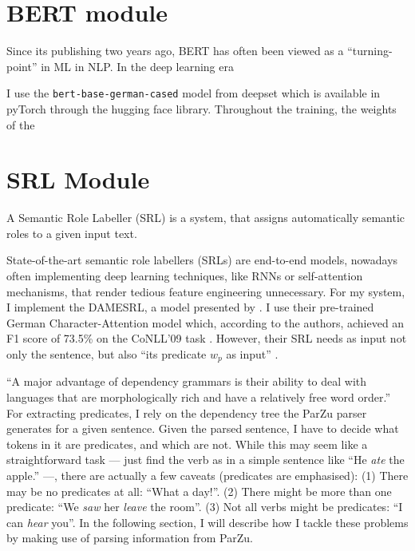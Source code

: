 \section{BERT module}

Since its publishing two years ago, BERT \citep{devlin2018bert} has often been viewed as a
``turning-point'' in ML in NLP. In the deep learning era 

I use the \texttt{bert-base-german-cased} model from deepset which is available in pyTorch
through the hugging face library\cite{wolf2019transformers}.
Throughout the training, the weights of the 

\section{SRL Module}

A Semantic Role Labeller (SRL) is a system, that assigns automatically semantic roles to a
given input text.

State-of-the-art semantic role labellers (SRLs) are end-to-end models, nowadays often
implementing deep learning techniques, like RNNs or self-attention mechanisms, that render
tedious feature engineering unnecessary.  For my system, I implement the DAMESRL, a model
presented by \cite{do2018flexible}.  I use their pre-trained German Character-Attention
model which, according to the authors, achieved an F1 score of 73.5\% on the CoNLL'09 task
\citep{hajivc2009conll}.  However, their SRL needs as input not only the sentence, but also
``its predicate $w_p$ as input'' \citep{do2018flexible}.

``A major advantage of dependency grammars is their ability to deal with languages that are
morphologically rich and have a relatively free word order.'' \citep[p.~274]{jurafsky2019speech}
For extracting predicates, I rely on the dependency tree the ParZu parser
\cite{sennrich2013exploiting} generates for a given sentence.  Given the parsed sentence, I
have to decide what tokens in it are predicates, and which are not.  While this may seem like
a straightforward task --- just find the verb as in a simple sentence like ``He \emph{ate}
the apple.'' ---, there are actually a few caveats (predicates are emphasised): (1) There
may be no predicates at all: ``What a day!''. (2) There might be more than one predicate:
``We \emph{saw} her \emph{leave} the room''. (3) Not all verbs might be predicates: ``I can
\emph{hear} you''.  In the following section, I will describe how I tackle these problems by
making use of parsing information from ParZu.

